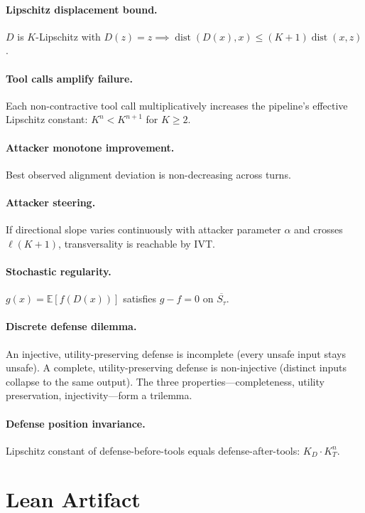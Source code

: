 \documentclass[11pt]{article}
\newcommand{\cl}[1]{\overline{#1}}
\newcommand{\dist}{\operatorname{dist}}
\begin{document}
\paragraph{Lipschitz displacement bound.}
$D$ is $K$-Lipschitz with $D(z) = z \implies
\dist(D(x), x) \leq (K+1)\dist(x,z)$.

\paragraph{Tool calls amplify failure.}
Each non-contractive tool call multiplicatively increases the pipeline's
effective Lipschitz constant: $K^n < K^{n+1}$ for $K \geq 2$.

\paragraph{Attacker monotone improvement.}
Best observed alignment deviation is non-decreasing across turns.

\paragraph{Attacker steering.}
If directional slope varies continuously with attacker parameter $\alpha$
and crosses $\ell(K+1)$, transversality is reachable by IVT.

\paragraph{Stochastic regularity.}
$g(x) = \mathbb{E}[f(D(x))]$ satisfies $g - f = 0$ on $\cl{S_\tau}$.

\paragraph{Discrete defense dilemma.}
An injective, utility-preserving defense is incomplete (every unsafe
input stays unsafe). A complete, utility-preserving defense is
non-injective (distinct inputs collapse to the same output).
The three properties---completeness, utility preservation,
injectivity---form a trilemma.

\paragraph{Defense position invariance.}
Lipschitz constant of defense-before-tools equals defense-after-tools:
$K_D \cdot K_T^n$.


\section{Lean Artifact}
\label{app:artifact}
\end{document}
